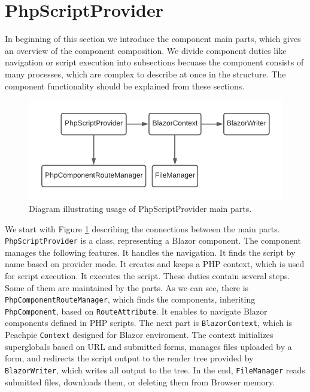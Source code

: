 \section{PhpScriptProvider}

In beginning of this section we introduce the component main parts, which gives an overview of the component composition.
We divide component duties like navigation or script execution into subsections
becuase the component consists of many processes, which are complex to describe at once in the structure.
The component functionality should be explained from these sections.
\par
\begin{figure}[b]\centering
\includegraphics[scale=0.8]{./img/PhpScriptProvider}
\caption{Diagram illustrating usage of PhpScriptProvider main parts.}
\label{img18:provider}
\end{figure}
\par
We start with Figure \ref{img18:provider} describing the connections between the main parts.
\texttt{PhpScriptProvider} is a class, representing a Blazor component.
The component manages the following features.
It handles the navigation.
It finds the script by name based on provider mode.
It creates and keeps a PHP context, which is used for script execution.
It executes the script.
These duties contain several steps.
Some of them are maintained by the parts.
As we can see, there is \texttt{PhpComponentRouteManager}, which finds the components, inheriting \texttt{PhpComponent}, based on \texttt{RouteAttribute}.
It enables to navigate Blazor components defined in PHP scripts.
The next part is \texttt{BlazorContext}, which is Peachpie \texttt{Context} designed for Blazor enviroment.
The context initializes superglobals based on URL and submitted forms, manages files uploaded by a form, and redirects the script output to the render tree provided by \texttt{BlazorWriter}, which writes all output to the tree.
In the end, \texttt{FileManager} reads submitted files, downloads them, or deleting them from Browser memory.
